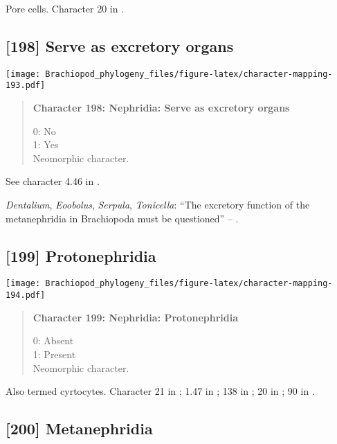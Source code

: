 \documentclass[openany]{book}
\theoremstyle{definition}
\theoremstyle{definition}
\theoremstyle{definition}
\theoremstyle{remark}
\begin{document}
Pore cells. Character 20 in \citet{Haszprunar2000}.

\subsection*{{[}198{]} Serve as excretory
organs}\label{serve-as-excretory-organs}

\texttt{[image: Brachiopod\_phylogeny\_files/figure-latex/character-mapping-193.pdf]}

\begin{quote}
\textbf{Character 198: Nephridia: Serve as excretory organs}

0: No\\
1: Yes\\
Neomorphic character.
\end{quote}

See character 4.46 in \citet{SPS1996}.

\hypertarget{Dentalium-coding-198}{}
\emph{Dentalium}, \emph{Eoobolus}, \emph{Serpula}, \emph{Tonicella}:
``The excretory function of the metanephridia in Brachiopoda must be
questioned'' -- \citet{Luter1995}.

\subsection*{{[}199{]} Protonephridia}\label{protonephridia}

\texttt{[image: Brachiopod\_phylogeny\_files/figure-latex/character-mapping-194.pdf]}

\begin{quote}
\textbf{Character 199: Nephridia: Protonephridia}

0: Absent\\
1: Present\\
Neomorphic character.
\end{quote}

Also termed cyrtocytes. Character 21 in \citet{Grobe2007}; 1.47 in
\citet{SPS1996}; 138 in \citet{Rouse1999}; 20 in \citet{Haszprunar1996};
90 in \citet{Glenner2004}.

\subsection*{{[}200{]} Metanephridia}\label{metanephridia}
\end{document}
